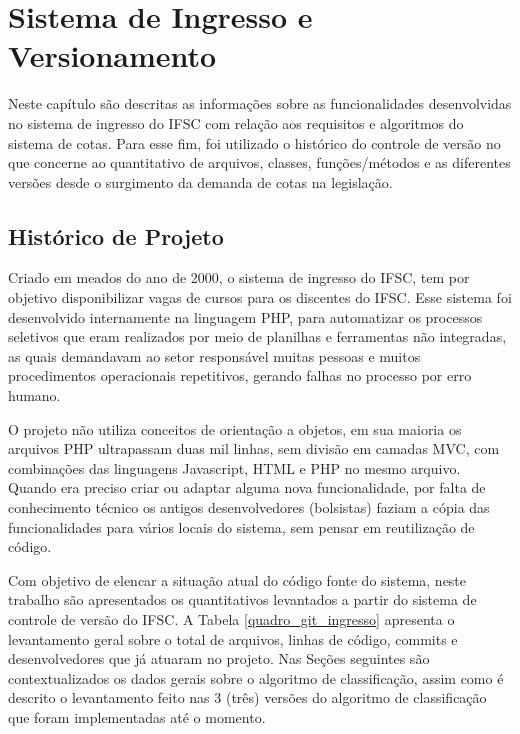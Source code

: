 \chapter{Sistema de Ingresso e Versionamento}
\label{chap:historicoversoes}

Neste capítulo são descritas as informações sobre as funcionalidades desenvolvidas no sistema de ingresso do \gls{IFSC} com relação aos requisitos e algoritmos do sistema de cotas. Para esse fim, foi utilizado o histórico do controle de versão no que concerne ao quantitativo de arquivos, classes, funções/métodos e as diferentes versões desde o surgimento da demanda de cotas na legislação.

\section{Histórico de Projeto}
\label{historicopj}
Criado em meados do ano de 2000, o sistema de ingresso do \gls{IFSC}, tem por objetivo disponibilizar vagas de cursos para os discentes do \gls{IFSC}. Esse sistema foi desenvolvido internamente na linguagem PHP, para automatizar os processos seletivos que eram realizados por meio de planilhas e ferramentas não integradas, as quais demandavam ao setor responsável muitas pessoas e muitos procedimentos operacionais repetitivos, gerando falhas no processo por erro humano.

O projeto não utiliza conceitos de orientação a objetos, em sua maioria os arquivos PHP ultrapassam duas mil linhas, sem divisão em camadas \gls{MVC}, com combinações das linguagens Javascript, HTML e PHP no mesmo arquivo. Quando era preciso criar ou adaptar alguma nova funcionalidade, por falta de conhecimento técnico os antigos desenvolvedores (bolsistas) faziam a cópia das funcionalidades para vários locais do sistema, sem pensar em reutilização de código.

Com objetivo de elencar a situação atual do código fonte do sistema, neste trabalho são apresentados os quantitativos levantados a partir do sistema de controle de versão do \gls{IFSC}. A Tabela \ref{quadro_git_ingresso} apresenta o levantamento geral sobre o total de arquivos, linhas de código, commits e desenvolvedores que já atuaram no projeto. Nas Seções seguintes são contextualizados os dados gerais sobre o algoritmo de classificação, assim como é descrito o levantamento feito nas 3 (três) versões do algoritmo de classificação que foram implementadas até o momento.




